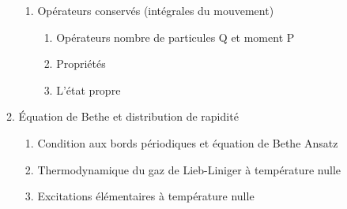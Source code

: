 \documentclass[8pt, landscape]{report}
\begin{document}
\begin{multicols}{3}
\begin{enumerate}
\begin{enumerate}
\begin{enumerate}
					\item Opérateurs conservés (intégrales du mouvement) 
						\begin{enumerate}
							\item Opérateurs nombre de particules Q et moment P
							\item Propriétés
							\item L’état propre
						\end{enumerate}
				\end{enumerate}	
			\item Équation de Bethe et distribution de rapidité
				\begin{enumerate}
					\item Condition aux bords périodiques et équation de Bethe Ansatz 
					\item Thermodynamique du gaz de Lieb-Liniger à température nulle 
					\item Excitations élémentaires à température nulle
				\end{enumerate}
		\end{enumerate}
		

\end{enumerate}
\end{multicols}
\end{document}
